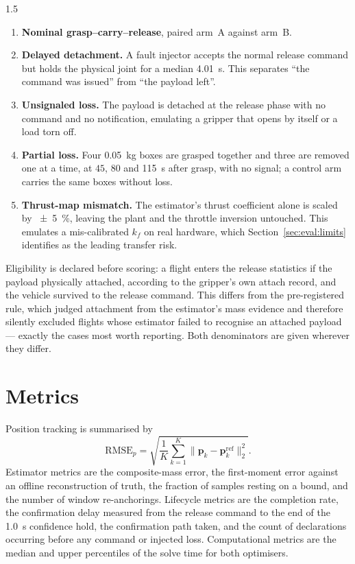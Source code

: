 \begin{spacing}{1.5}
\begin{enumerate}
\item \textbf{Nominal grasp--carry--release}, paired arm~A against arm~B.
\item \textbf{Delayed detachment.} A fault injector accepts the normal release
command but holds the physical joint for a median \SI{4.01}{\second}. This
separates ``the command was issued'' from ``the payload left''.
\item \textbf{Unsignaled loss.} The payload is detached at the release phase with
no command and no notification, emulating a gripper that opens by itself or a
load torn off.
\item \textbf{Partial loss.} Four \SI{0.05}{\kg} boxes are grasped together and
three are removed one at a time, at $45$, $80$ and \SI{115}{\second} after
grasp, with no signal; a control arm carries the same boxes without loss.
\item \textbf{Thrust-map mismatch.} The estimator's thrust coefficient alone is
scaled by \SI{\pm5}{\percent}, leaving the plant and the throttle inversion
untouched. This emulates a mis-calibrated $k_f$ on real hardware, which
Section~\ref{sec:eval:limits} identifies as the leading transfer risk.
\end{enumerate}

Eligibility is declared before scoring: a flight enters the release statistics if
the payload physically attached, according to the gripper's own attach record,
and the vehicle survived to the release command. This differs from the
pre-registered rule, which judged attachment from the estimator's mass evidence
and therefore silently excluded flights whose estimator failed to recognise an
attached payload --- exactly the cases most worth reporting. Both denominators
are given wherever they differ.

\section{Metrics}\label{sec:eval:metrics}

Position tracking is summarised by
\begin{equation}
\mathrm{RMSE}_p = \sqrt{\frac{1}{K}\sum_{k=1}^{K}\bigl\lVert\bm p_k - \bm p^{\mathrm{ref}}_k\bigr\rVert_2^2}.
\label{eq:rmse}
\end{equation}
Estimator metrics are the composite-mass error, the first-moment error against an
offline reconstruction of truth, the fraction of samples resting on a bound, and
the number of window re-anchorings. Lifecycle metrics are the completion rate,
the confirmation delay measured from the release command to the end of the
\SI{1.0}{\second} confidence hold, the confirmation path taken, and the count of
declarations occurring before any command or injected loss. Computational metrics
are the median and upper percentiles of the solve time for both optimisers.


\end{spacing}

